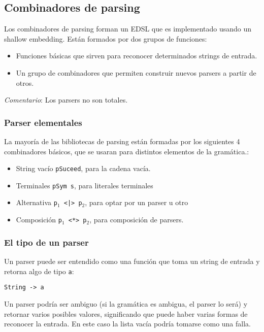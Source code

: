 \documentclass{article}
\newcommand{\imp}[1]{\textcolor{color1}{#1}}
\begin{document}
\subsection{Combinadores de parsing}\label{subsec:sombinadores_de_parsing}

Los combinadores de parsing forman un EDSL que es implementado usando un shallow embedding. Están formados por dos grupos de funciones:

\begin{itemize}
\item Funciones básicas que sirven para reconocer determinados strings de entrada.
\item Un grupo de combinadores que permiten construir nuevos parsers a partir de otros.
\end{itemize}

\imp{\emph{Comentario}}: Los parsers no son totales.

\subsubsection{Parser elementales}

La mayoría de las bibliotecas de parsing están formadas por los siguientes 4 combinadores básicos, que se usaran para distintos elementos de la gramática.:

\begin{itemize}
\item String vacío \texttt{pSuceed}, para la cadena vacía.
\item Terminales \texttt{pSym s}, para literales terminales
\item Alternativa \texttt{p$_1$ <|>~p$_2$}, para optar por un parser u otro
\item Composición \texttt{p$_1$ <*>~p$_2$}, para composición de parsers.
\end{itemize}

\subsubsection{El tipo de un parser}

Un parser puede ser entendido como una función que toma un string de entrada y retorna algo de tipo \imp{\texttt{a}}:

\begin{lstlisting}
String -> a
\end{lstlisting}

Un parser podría ser ambiguo (si la gramática es ambigua, el parser lo será) y retornar varios posibles valores, significando que puede haber varias formas de reconocer la entrada. En este caso la lista vacía podría tomarse como una falla.
\end{document}
